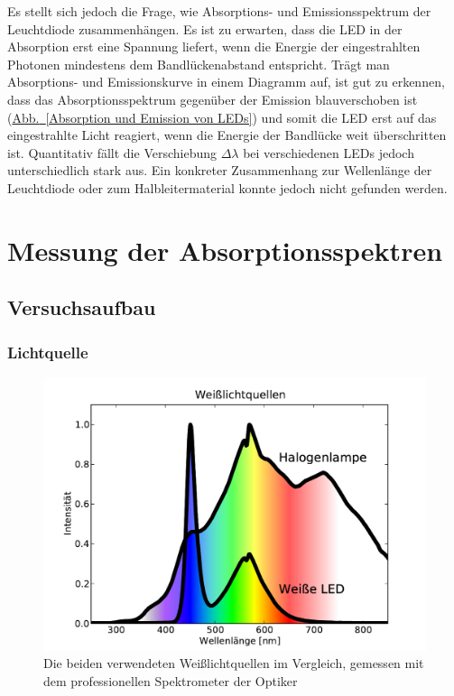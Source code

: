 \documentclass[11pt]{scrartcl}
\newcommand{\hypref}[2]{\hyperref[#2]{{#1}~\ref{#2}}}
\begin{document}
Es stellt sich jedoch die Frage, wie Absorptions- und Emissionsspektrum der Leuchtdiode zusammenh\"angen.
Es ist zu erwarten, dass die LED in der Absorption erst eine Spannung liefert, wenn die Energie der eingestrahlten Photonen mindestens dem Bandlückenabstand entspricht.
Tr\"agt man Absorptions- und Emissionskurve in einem Diagramm auf, ist gut zu erkennen, dass das Absorptionsspektrum gegen\"uber der Emission blauverschoben ist (\hypref{Abb.}{Absorption und Emission von LEDs}) und somit die LED erst auf das eingestrahlte Licht reagiert, wenn die Energie der Bandlücke weit überschritten ist. Quantitativ fällt die Verschiebung $\Delta \lambda$ bei verschiedenen LEDs jedoch unterschiedlich stark aus.
Ein konkreter Zusammenhang zur Wellenlänge der Leuchtdiode oder zum Halbleitermaterial konnte jedoch nicht gefunden werden.



\FloatBarrier
\section{Messung der Absorptionsspektren}


\subsection{Versuchsaufbau}
\subsubsection{Lichtquelle} %
\begin{figure}[!b]
\begin{center}
\includegraphics[width=.8\textwidth]{quellspektren.pdf}
\end{center}
\vspace{-1.5\baselineskip}
\caption{Die beiden verwendeten Weißlichtquellen im Vergleich, gemessen mit dem professionellen Spektrometer der Optiker}
\label{fig:lichtquelle}
\end{figure}
\end{document}
